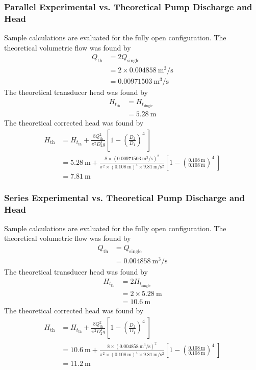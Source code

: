 \subsubsection{Parallel Experimental vs. Theoretical Pump Discharge and Head}
Sample calculations are evaluated for the fully open configuration. The theoretical volumetric flow was found by
\begin{align*}
    Q_{\text{th}} &= 2 Q_{\text{single}} \\
    &= 2 \times \qty{0.004858}{\meter\cubed\per\second} \\
    &= \qty{0.00971503}{\meter\cubed\per\second}
\end{align*}
The theoretical transducer head was found by
\begin{align*}
    H_{t_{\text{th}}} &= H_{t_{\text{single}}} \\
    &= \qty{5.28}{\meter}
\end{align*}
The theoretical corrected head was found by
\begin{align*}
    H_{\text{th}} &= H_{t_{\text{th}}} + \frac{8Q_{\text{th}}^2}{\pi^2 D_2^4 g} \left[1 - \left(\frac{D_2}{D_1}\right)^4\ \right] \\
    &= \qty{5.28}{\meter} + \frac{8 \times (\qty{0.00971503}{\meter\cubed\per\second})^2}{\pi^2 \times (\qty{0.108}{\meter})^4 \times \qty{9.81}{\meter\per\second\squared}} \left[1 - \left(\frac{\qty{0.108}{\meter}}{\qty{0.108}{\meter}}\right)^4\ \right] \\
    &= \qty{7.81}{\meter}
\end{align*}

\subsubsection{Series Experimental vs. Theoretical Pump Discharge and Head}
Sample calculations are evaluated for the fully open configuration. The theoretical volumetric flow was found by
\begin{align*}
    Q_{\text{th}} &= Q_{\text{single}} \\
    &= \qty{0.004858}{\meter\cubed\per\second}
\end{align*}
The theoretical transducer head was found by
\begin{align*}
    H_{t_{\text{th}}} &= 2 H_{t_{\text{single}}} \\
    &= 2 \times \qty{5.28}{\meter} \\
    &= \qty{10.6}{\meter}
\end{align*}
The theoretical corrected head was found by
\begin{align*}
    H_{\text{th}} &= H_{t_{\text{th}}} + \frac{8Q_{\text{th}}^2}{\pi^2 D_2^4 g} \left[1 - \left(\frac{D_2}{D_1}\right)^4\ \right] \\
    &= \qty{10.6}{\meter} + \frac{8 \times (\qty{0.004858}{\meter\cubed\per\second})^2}{\pi^2 \times (\qty{0.108}{\meter})^4 \times \qty{9.81}{\meter\per\second\squared}} \left[1 - \left(\frac{\qty{0.108}{\meter}}{\qty{0.108}{\meter}}\right)^4\ \right] \\
    &= \qty{11.2}{\meter}
\end{align*}

